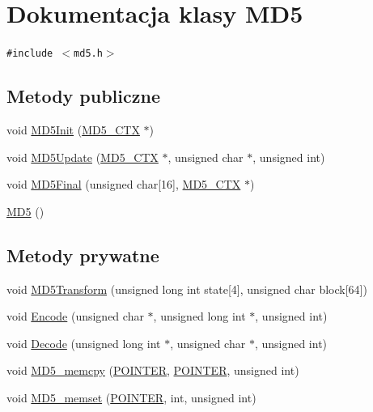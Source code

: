 \hypertarget{a00002}{
\section{Dokumentacja klasy MD5}
\label{d7/d46/a00002}
}
{\tt \#include $<$md5.h$>$}

\subsection*{Metody publiczne}
\begin{CompactItemize}
\item 
void \hyperlink{a00002_72b35c041cb6983aaa74e2f1c31d5a29}{MD5Init} (\hyperlink{a00003}{MD5\_\-CTX} $\ast$)
\item 
void \hyperlink{a00002_a59116f0a26354a217fa186a43cd9d28}{MD5Update} (\hyperlink{a00003}{MD5\_\-CTX} $\ast$, unsigned char $\ast$, unsigned int)
\item 
void \hyperlink{a00002_98039031d87c1f5b787050e2b487d83f}{MD5Final} (unsigned char\mbox{[}16\mbox{]}, \hyperlink{a00003}{MD5\_\-CTX} $\ast$)
\item 
\hyperlink{a00002_fa6155ec36de415ab2dcf5e54b670d13}{MD5} ()
\end{CompactItemize}
\subsection*{Metody prywatne}
\begin{CompactItemize}
\item 
void \hyperlink{a00002_849ad3347bad15a23f3a40452476b1e0}{MD5Transform} (unsigned long int state\mbox{[}4\mbox{]}, unsigned char block\mbox{[}64\mbox{]})
\item 
void \hyperlink{a00002_c3c05716498203127920ba78b3ae8115}{Encode} (unsigned char $\ast$, unsigned long int $\ast$, unsigned int)
\item 
void \hyperlink{a00002_ef62580b93f2122c62493464787b814a}{Decode} (unsigned long int $\ast$, unsigned char $\ast$, unsigned int)
\item 
void \hyperlink{a00002_76c181f092e81df65dadf8861272ac80}{MD5\_\-memcpy} (\hyperlink{a00011_73204e40637f83518fb695362ea084a4}{POINTER}, \hyperlink{a00011_73204e40637f83518fb695362ea084a4}{POINTER}, unsigned int)
\item 
void \hyperlink{a00002_e1a522aab83da49d1bd3f0a6f3edcd11}{MD5\_\-memset} (\hyperlink{a00011_73204e40637f83518fb695362ea084a4}{POINTER}, int, unsigned int)
\end{CompactItemize}



